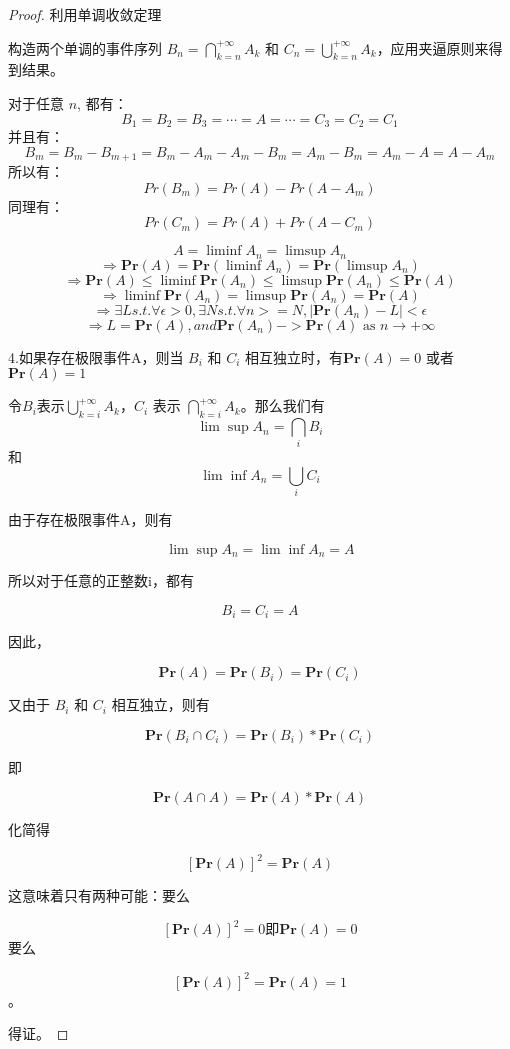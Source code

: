 \documentclass[12pt, a4paper, oneside]{ctexart}
\begin{document}
\begin{proof}
  利用单调收敛定理

  构造两个单调的事件序列 $B_n = \bigcap_{k=n}^{+\infty}A_k$ 和 $C_n = \bigcup_{k=n}^{+ \infty}A_k$，应用夹逼原则来得到结果。

  对于任意 $n$, 都有： $$ B_1=B_2=B_3=\cdots=A=\cdots=C_3=C_2=C_1 $$ 并且有： $$ B_m=B_m-B_{m+1}=B_m-A_m-A_m-B_m=A_m-B_m=A_m-A=A-A_m $$ 所以有： $$ Pr(B_m)=Pr(A)-Pr(A-A_m) $$ 同理有： $$ Pr(C_m)=Pr(A)+Pr(A-C_m) $$

  $$ A=\liminf A_n=\limsup A_n$$
  $$\Rightarrow \mathbf{Pr}(A)=\mathbf{Pr}(\liminf A_n)=\mathbf{Pr}(\limsup A_n) $$
  $$\Rightarrow \mathbf{Pr}(A) \leq \liminf \mathbf{Pr}(A_n) \leq \limsup \mathbf{Pr}(A_n) \leq \mathbf{Pr}(A) $$
  $$\Rightarrow \liminf \mathbf{Pr}(A_n)=\limsup \mathbf{Pr}(A_n)=\mathbf{Pr}(A) $$
  $$\Rightarrow \exists L s.t. \forall \epsilon > 0, \exists N s.t. \forall n >= N, |\mathbf{Pr}(A_n)-L| < \epsilon $$
  $$\Rightarrow L=\mathbf{Pr}(A), and \mathbf{Pr}(A_n)->\mathbf{Pr}(A) \text{ as } n\rightarrow +\infty $$

  4.如果存在极限事件A，则当 $B_i$ 和 $C_i$ 相互独立时，有$\mathbf{Pr}(A)=0$ 或者 $\mathbf{Pr}(A)=1$

  令$B_i$表示$\bigcup_{k = i}^{+ \infty} A_k$，$C_i$ 表示 $\bigcap_{k = i}^{+ \infty} A_k$。那么我们有
  $$\lim \sup A_n = \bigcap_i B_i$$
  和 $$\lim \inf A_n = \bigcup_i C_i$$

  由于存在极限事件A，则有

  $$\lim \sup A_n=\lim \inf A_n=A$$

  所以对于任意的正整数i，都有

  $$B_i=C_i=A$$

  因此，

  $$\mathbf{Pr}(A)=\mathbf{Pr}(B_i)=\mathbf{Pr}(C_i)$$

  又由于 $B_i$ 和 $C_i$ 相互独立，则有

  $$\mathbf{Pr}(B_i\cap C_i)=\mathbf{Pr}(B_i)*\mathbf{Pr}(C_i)$$

  即

  $$\mathbf{Pr}(A\cap A)=\mathbf{Pr}(A)*\mathbf{Pr}(A)$$

  化简得

  $$[\mathbf{Pr}(A)]^2=\mathbf{Pr}(A)$$

  这意味着只有两种可能：要么

  $$[\mathbf{Pr}(A)]^2=0 即 \mathbf{Pr}(A)=0$$要么

  $$[\mathbf{Pr}(A)]^2=\mathbf{Pr}(A)=1$$。

  得证。
\end{proof}
\end{document}
